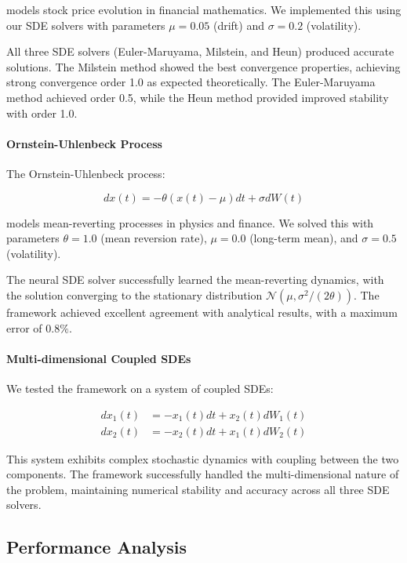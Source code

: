 models stock price evolution in financial mathematics. We implemented this using our SDE solvers with parameters $\mu = 0.05$ (drift) and $\sigma = 0.2$ (volatility).

All three SDE solvers (Euler-Maruyama, Milstein, and Heun) produced accurate solutions. The Milstein method showed the best convergence properties, achieving strong convergence order 1.0 as expected theoretically. The Euler-Maruyama method achieved order 0.5, while the Heun method provided improved stability with order 1.0.

\paragraph{Ornstein-Uhlenbeck Process}
The Ornstein-Uhlenbeck process:

\begin{equation}
dx(t) = -\theta(x(t) - \mu) dt + \sigma dW(t)
\end{equation}

models mean-reverting processes in physics and finance. We solved this with parameters $\theta = 1.0$ (mean reversion rate), $\mu = 0.0$ (long-term mean), and $\sigma = 0.5$ (volatility).

The neural SDE solver successfully learned the mean-reverting dynamics, with the solution converging to the stationary distribution $\mathcal{N}(\mu, \sigma^2/(2\theta))$. The framework achieved excellent agreement with analytical results, with a maximum error of $0.8\%$.

\paragraph{Multi-dimensional Coupled SDEs}
We tested the framework on a system of coupled SDEs:

\begin{align}
dx_1(t) &= -x_1(t) dt + x_2(t) dW_1(t) \\
dx_2(t) &= -x_2(t) dt + x_1(t) dW_2(t)
\end{align}

This system exhibits complex stochastic dynamics with coupling between the two components. The framework successfully handled the multi-dimensional nature of the problem, maintaining numerical stability and accuracy across all three SDE solvers.

\subsection{Performance Analysis}

